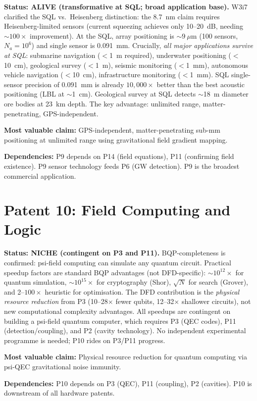 \documentclass[11pt]{article}
\begin{document}
\begin{tcolorbox}[colback=green!5!white, colframe=green!40!black,
  title=\textbf{P9: ALIVE --- Resource Allocation: 3/5}]
\textbf{Status: ALIVE (transformative at SQL; broad application base).}
W3i7 clarified the SQL vs.\ Heisenberg distinction: the 8.7~nm claim
requires Heisenberg-limited sensors (current squeezing achieves only
10--20~dB, needing $\sim 100\times$ improvement). At the SQL, array
positioning is $\sim 9~\mu$m (100 sensors, $N_a = 10^6$) and single
sensor is 0.091~mm. Crucially, \emph{all major applications survive
at SQL}: submarine navigation ($<$1~m required), underwater positioning
($<$10~cm), geological survey ($<$1~m), seismic monitoring ($<$1~mm),
autonomous vehicle navigation ($<$10~cm), infrastructure monitoring
($<$1~mm). SQL single-sensor precision of 0.091~mm is already
$10{,}000\times$ better than the best acoustic positioning (LBL at
$\sim$1~cm). Geological survey at SQL detects $\sim$18~m diameter
ore bodies at 23~km depth. The key advantage: unlimited range,
matter-penetrating, GPS-independent.

\textbf{Most valuable claim:} GPS-independent, matter-penetrating
sub-mm positioning at unlimited range using gravitational field
gradient mapping.

\textbf{Dependencies:} P9 depends on P14 (field equations), P11
(confirming field existence). P9 sensor technology feeds P6 (GW
detection). P9 is the broadest commercial application.
\end{tcolorbox}

\section{Patent 10: Field Computing and Logic}
\label{sec:P10}

\begin{tcolorbox}[colback=yellow!5!white, colframe=yellow!60!black,
  title=\textbf{P10: NICHE --- Resource Allocation: 1/5}]
\textbf{Status: NICHE (contingent on P3 and P11).}
BQP-completeness is confirmed: psi-field computing can simulate any
quantum circuit. Practical speedup factors are standard BQP advantages
(not DFD-specific): $\sim 10^{12}\times$ for quantum simulation,
$\sim 10^{15}\times$ for cryptography (Shor), $\sqrt{N}$ for search
(Grover), and 2--$100\times$ heuristic for optimisation. The DFD
contribution is the \emph{physical resource reduction} from P3
(10--28$\times$ fewer qubits, 12--32$\times$ shallower circuits),
not new computational complexity advantages. All speedups are
contingent on building a psi-field quantum computer, which requires
P3 (QEC codes), P11 (detection/coupling), and P2 (cavity technology).
No independent experimental programme is needed; P10 rides on P3/P11
progress.

\textbf{Most valuable claim:} Physical resource reduction for quantum
computing via psi-QEC gravitational noise immunity.

\textbf{Dependencies:} P10 depends on P3 (QEC), P11 (coupling), P2
(cavities). P10 is downstream of all hardware patents.
\end{tcolorbox}
\end{document}
